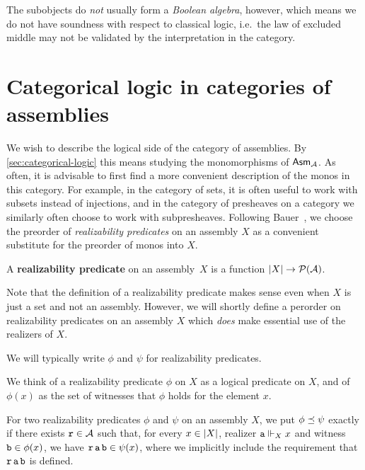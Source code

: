 The subobjects do \emph{not} usually form a \emph{Boolean algebra}, however,
which means we do not have soundness with respect to classical logic, i.e.\ the
law of excluded middle may not be validated by the interpretation in the
category.


\section{Categorical logic in categories of assemblies}\label{sec:cat-logic-in-asm}

We wish to describe the logical side of the category of assemblies. By
\cref{sec:categorical-logic} this means studying the monomorphisms of
\(\mathsf{Asm}_{\mathcal A}\).
%
As often, it is advisable to first find a more convenient description of the
monos in this category. For example, in the category of sets, it is often useful
to work with subsets instead of injections, and in the category of presheaves on
a category we similarly often choose to work with subpresheaves.
%
Following Bauer~\cite{Bauer2023}, we choose the preorder of \emph{realizability
  predicates} on an assembly \(X\) as a convenient substitute for the preorder of
monos into \(X\).
%


\begin{definition}
  A \textbf{realizability predicate} on an assembly~\(X\) is a function
  \(\lvert X\rvert \to \mathcal P(\mathcal A)\).
\end{definition}

Note that the definition of a realizability predicate makes sense even when
\(X\) is just a set and not an assembly. However, we will shortly define a
perorder on realizability predicates on an assembly \(X\) which \emph{does} make
essential use of the realizers of \(X\).

\begin{notation}
  We will typically write \(\phi\) and \(\psi\) for realizability predicates.
\end{notation}

We think of a realizability predicate \(\phi\) on \(X\) as a logical predicate
on \(X\), and of \(\phi(x)\) as the set of witnesses that \(\phi\) holds for the
element \(x\).

\begin{definition}
  For two realizability predicates \(\phi\) and \(\psi\) on an assembly \(X\),
  we put \( \phi \preceq \psi \) exactly if there exists \(\operatorname{\mathtt{r}} \in \mathcal A\)
  such that, for every \(x \in \lvert X\rvert\), realizer \(\operatorname{\mathtt{a}} \Vdash_X x\)
  and witness \(\operatorname{\mathtt{b}} \in \phi(x)\), we have
  \(\operatorname{\mathtt{r}}\operatorname{\mathtt{a}}\operatorname{\mathtt{b}} \in \psi(x)\),
  where we implicitly include the requirement that \(\operatorname{\mathtt{r}}\operatorname{\mathtt{a}}\operatorname{\mathtt{b}}\) is defined.
\end{definition}


